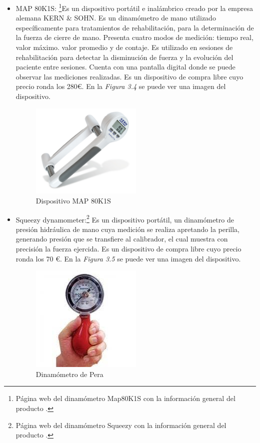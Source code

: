 \begin{itemize}
    \item MAP 80K1S: \cite{Map80k1s}\footnote{Página web del dinamómetro Map80K1S con la información general del producto \cite{Map80k1s}.}Es un dispositivo portátil e inalámbrico creado por la empresa alemana KERN \& SOHN. Es un dinamómetro de mano utilizado específicamente para tratamientos de rehabilitación, para la determinación de la fuerza de cierre de mano.
    Presenta cuatro modos de medición: tiempo real, valor máximo. valor promedio y de contaje. 
    Es utilizado en sesiones de rehabilitación para detectar la disminución de fuerza y la evolución del paciente entre sesiones. Cuenta con una pantalla digital donde se puede observar las mediciones realizadas.
    Es un dispositivo de compra libre cuyo precio ronda los 280€. En la \textit{Figura 3.4} se puede ver una imagen del dispositivo.
      \begin{figure}[h]
        \centering
        \includegraphics[width=0.5\textwidth]{img/MAP-80K1S.jpg}
        \caption{Dispositivo MAP 80K1S}
        \label{fig:activforce}
    \end{figure}
    
    \item Squeezy dynamometer:\cite{SqueezeDinamometro}\footnote{Página web del dinamómetro Squeezy con la información general del producto \cite{SqueezeDinamometro}.} Es un dispositivo portátil, un dinamómetro de presión hidráulica de mano cuya medición se realiza apretando la perilla, generando presión que se transfiere al calibrador, el cual muestra con precisión la fuerza ejercida. Es un dispositivo de compra libre cuyo precio ronda los 70 €. En la \textit{Figura 3.5} se puede ver una imagen del dispositivo.
    \begin{figure}[h]
        \centering
        \includegraphics[width=0.5\textwidth]{img/Dinamometro pera.jpeg}
        \caption{Dinamómetro de Pera}
        \label{fig:activforce}
    \end{figure}
\end{itemize}
